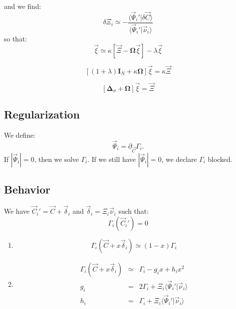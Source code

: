 \documentclass[aps,12pt]{revtex4}
\begin{document}
and we find:
\begin{equation}
	\delta \Xi_i \simeq - \dfrac{\langle \vec{\Psi}_i' \vert \delta\vec{C}\rangle}{\langle \vec{\Psi}_i' \vert \vec{\nu}_i \rangle}
\end{equation}
so that:
\begin{equation}
	 \vec{\xi} \simeq \kappa \left[ \vec{\Xi} - \bm{\Omega}\vec{\xi} \right] - \lambda \vec{\xi}
\end{equation} 

\begin{equation}
	\left[ (1+\lambda) \bm{I}_N + \kappa \bm{\Omega} \right] \vec{\xi} = \kappa \vec{\Xi}
\end{equation}

\begin{equation}
	\left[ \bm{\Delta}_\sigma + \bm{\Omega} \right] \vec{\xi} = \vec{\Xi}
\end{equation}


\subsection{Regularization}
We define:
\begin{equation}
\vec{\Psi}_i = \partial_{\vec{C}} \Gamma_i.
\end{equation}
If $|\vec{\Psi}_i|=0$, then we solve $\Gamma_i$. If we still have $|\vec{\Psi}_i|=0$, we declare $\Gamma_i$ blocked.

\subsection{Behavior}
We have $\vec{C}_i'=\vec{C} + \vec{\delta}_i$ and $\vec{\delta}_i = \Xi_i \vec{\nu}_i$ such that:
\begin{equation}
	\Gamma_i(\vec{C}_i') = 0
\end{equation}

\begin{enumerate}
\item
\begin{equation}
	\Gamma_i(\vec{C} + x \vec{\delta}_i) \simeq (1-x) \Gamma_i
\end{equation}

\item
\begin{equation}
\begin{array}{rcl}
	\Gamma_i(\vec{C} + x  \vec{\delta}_i) & \simeq & \Gamma_i -g_i x + h_i x^2\\
	g_i & = & 2\Gamma_i + \Xi_i \langle\vec{\Psi}_i'  \vert \vec{\nu}_i \rangle\\
	h_i & = & \Gamma_i + \Xi_i \langle\vec{\Psi}_i'  \vert \vec{\nu}_i \rangle\\
\end{array}
\end{equation}

\end{enumerate}
 
\end{document}
